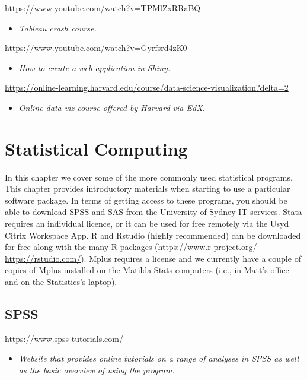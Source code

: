 \documentclass[
]{book}
\providecommand{\tightlist}{%
  \setlength{\itemsep}{0pt}\setlength{\parskip}{0pt}}
\begin{document}
\url{https://www.youtube.com/watch?v=TPMlZxRRaBQ}

\begin{itemize}
\tightlist
\item
  \emph{Tableau crash course.}
\end{itemize}

\url{https://www.youtube.com/watch?v=Gyrfsrd4zK0}

\begin{itemize}
\tightlist
\item
  \emph{How to create a web application in Shiny.}
\end{itemize}

\url{https://online-learning.harvard.edu/course/data-science-visualization?delta=2}

\begin{itemize}
\tightlist
\item
  \emph{Online data viz course offered by Harvard via EdX.}
\end{itemize}

\chapter{Statistical Computing}\label{statistical-computing}

In this chapter we cover some of the more commonly used statistical programs. This chapter provides introductory materials when starting to use a particular software package. In terms of getting access to these programs, you should be able to download SPSS and SAS from the University of Sydney IT services. Stata requires an individual licence, or it can be used for free remotely via the Usyd Citrix Workspace App. R and Rstudio (highly recommended) can be downloaded for free along with the many R packages (\url{https://www.r-project.org/} \url{https://rstudio.com/}). Mplus requires a license and we currently have a couple of copies of Mplus installed on the Matilda Stats computers (i.e., in Matt's office and on the Statistics's laptop).

\section{SPSS}\label{spss}

\url{https://www.spss-tutorials.com/}

\begin{itemize}
\tightlist
\item
  \emph{Website that provides online tutorials on a range of analyses in SPSS as well as the basic overview of using the program.}
\end{itemize}
\end{document}
